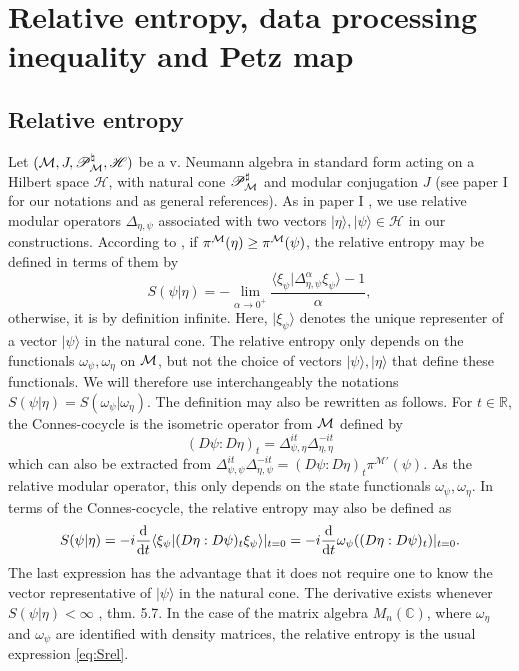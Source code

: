 \documentclass[english,a4paper,12pt]{article}
\def\sH{\mathscr{H}}
\def\sP{\mathscr{P}}
\def\cM{{\mathfrak M}}
\newcommand{\ca}[1]{{\cal #1}}
\newcommand{\ben}{\begin{equation}}
\newcommand{\een}{\end{equation}}
\def\cM{{\ca M}}
\newcommand{\dd}{{\rm d}}
\newcommand{\RR}{\mathbb{R}}
\newcommand{\CC}{\mathbb{C}}
\begin{document}
\section{Relative entropy, data processing inequality and Petz map}\label{sec:2}

\subsection{Relative entropy}

Let $(\cM, J, \sP_\cM^\natural, \sH)$ be a v. Neumann algebra in standard form acting on a Hilbert space $\sH$, 
with natural cone $\sP^\sharp_\cM$ and modular conjugation $J$ (see paper I \cite{Faulkner:2020iou} for our notations and \cite{Bratteli,Takesaki} as general references). 
As in paper I  \cite{Faulkner:2020iou}, we use relative modular operators $\Delta_{\eta,\psi}$ associated with two vectors 
$|\eta\rangle, |\psi\rangle \in \sH$ in our constructions. 
According to \cite{Araki1,Araki2}, if $\pi^\cM(\eta) \ge \pi^\cM(\psi)$, the relative entropy may be defined in terms of them by 
\ben
S(\psi | \eta) = -\lim_{\alpha \to 0^+} \frac{\langle \xi_\psi | \Delta^\alpha_{\eta, \psi} \xi_\psi \rangle-1}{\alpha} ,  
\een
otherwise, it is by definition infinite. Here, $|\xi_\psi\rangle$ denotes the unique representer of 
a vector $|\psi\rangle$ in the natural cone. The relative entropy only depends on the 
functionals $\omega_\psi, \omega_\eta$ on $\cM$, but not the choice of vectors $|\psi\rangle, |\eta\rangle$ that define these functionals. 
We will therefore use interchangeably the notations $S(\psi | \eta)=S(\omega_\psi | \omega_\eta)$.
The definition may also be rewritten as follows.  
For $t \in \RR$,  the Connes-cocycle is the isometric operator from $\cM$ defined by 
\ben
(D\psi : D\eta)_{t} = \Delta^{it}_{\psi,\eta} \Delta^{-it}_{\eta,\eta} %
\een
which can also be extracted from $ \Delta^{it}_{\psi,\psi} \Delta^{-it}_{\eta,\psi} = (D\psi : D\eta)_{t}  \pi^{\mathcal{M}'}(\psi) $.
As the relative modular operator, this only depends on the state functionals $\omega_\psi, \omega_\eta$.
In terms of the Connes-cocycle, the relative entropy may also be defined as
\ben
S(\psi | \eta) = -i\frac{\dd}{\dd t} \langle \xi_\psi | (D\eta : D\psi)_{t} \xi_\psi \rangle |_{t=0} = -i\frac{\dd}{\dd t} \omega_\psi( (D\eta : D\psi)_{t} ) |_{t=0}.  
\een
The last expression has the advantage that it does not require one to know the vector representative 
of $|\psi \rangle$ in the natural cone. The derivative exists whenever $S(\psi | \eta)<\infty$ \cite{Petz1993}, thm. 5.7.
In the case of the matrix algebra $M_n(\CC)$, where $\omega_\eta$ and $\omega_\psi$ are identified with density matrices, 
the relative entropy is the usual expression \eqref{eq:Srel}.
\end{document}
